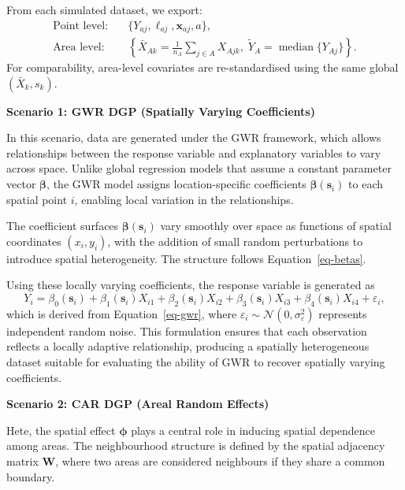 \documentclass[a4paper,reqno]{amsart}
\begin{document}
From each simulated dataset, we export:
\[
\begin{aligned}
\text{Point level:} \quad & \{Y_{aj}, \ell_{aj}, \mathbf{x}_{aj}, a\}, \\
\text{Area level:} \quad & \left\{
\bar{X}_{Ak} = \frac{1}{n_A} \sum_{j \in A} X_{Ajk}, \;
\tilde{Y}_A = \operatorname{median}\{Y_{Aj}\}
\right\}.
\end{aligned}
\]
For comparability, area-level covariates are re-standardised using the
same global $(\bar{X}_k, s_k)$.

\textbf{Scenario 1: GWR DGP (Spatially Varying Coefficients)}

In this scenario, data are generated under the GWR framework, which allows relationships between the
response variable and explanatory variables to vary across space. Unlike
global regression models that assume a constant parameter vector
$\boldsymbol{\beta}$, the GWR model assigns location-specific
coefficients $\boldsymbol{\beta}(\mathbf{s}_i)$ to each spatial point
$i$, enabling local variation in the relationships.

The coefficient surfaces $\boldsymbol{\beta}(\mathbf{s}_i)$ vary
smoothly over space as functions of spatial coordinates $(x_i, y_i)$,
with the addition of small random perturbations to introduce spatial
heterogeneity. The structure follows Equation~\ref{eq-betas}.

Using these locally varying coefficients, the response variable is
generated as
\begin{equation}
\label{eq-gwrgdp}
Y_i = \beta_0(\mathbf{s}_i)
+ \beta_1(\mathbf{s}_i) X_{i1}
+ \beta_2(\mathbf{s}_i) X_{i2}
+ \beta_3(\mathbf{s}_i) X_{i3}
+ \beta_4(\mathbf{s}_i) X_{i4}
+ \varepsilon_i,
\end{equation}
which is derived from Equation~\ref{eq-gwr}, where
$\varepsilon_i \sim \mathcal{N}(0, \sigma_\varepsilon^2)$ represents
independent random noise. This formulation ensures that each observation
reflects a locally adaptive relationship, producing a spatially
heterogeneous dataset suitable for evaluating the ability of GWR to
recover spatially varying coefficients.

\textbf{Scenario 2: CAR DGP (Areal Random Effects)}

Hete, the spatial effect
$\boldsymbol{\phi}$ plays a central role in inducing spatial dependence
among areas. The neighbourhood structure is defined by the spatial
adjacency matrix $\mathbf{W}$, where two areas are considered neighbours
if they share a common boundary.
\end{document}
